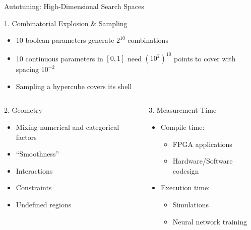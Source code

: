 \documentclass[10pt, compress, aspectratio=169, xcolor={table,usenames,dvipsnames}]{beamer}
\begin{document}
\begin{frame}[label={sec:org959a820}]{Autotuning: High-Dimensional Search Spaces}
\begin{block}{1. \alert{Combinatorial Explosion \& Sampling}}
\begin{itemize}
\item 10 boolean parameters generate \(2^{10}\) combinations
\item 10 continuous parameters in \([0, 1]\)  need \((10^{2})^{10}\) points to cover with
spacing \(10^{-2}\)
\item Sampling a hypercube covers its shell
\end{itemize}
\end{block}

\begin{columns}
\begin{column}{0.5\columnwidth}
\begin{block}{2. \alert{Geometry}}
\begin{itemize}
\item Mixing numerical and categorical factors
\item ``Smoothness''
\item Interactions
\item Constraints
\item Undefined regions
\end{itemize}
\end{block}
\end{column}

\begin{column}{0.5\columnwidth}
\begin{block}{3. \alert{Measurement Time}}
\begin{itemize}
\item Compile time:
\begin{itemize}
\item FPGA applications
\item Hardware/Software codesign
\end{itemize}
\item Execution time:
\begin{itemize}
\item Simulations
\item Neural network training
\end{itemize}
\end{itemize}
\end{block}
\end{column}
\end{columns}
\end{frame}
\end{document}
